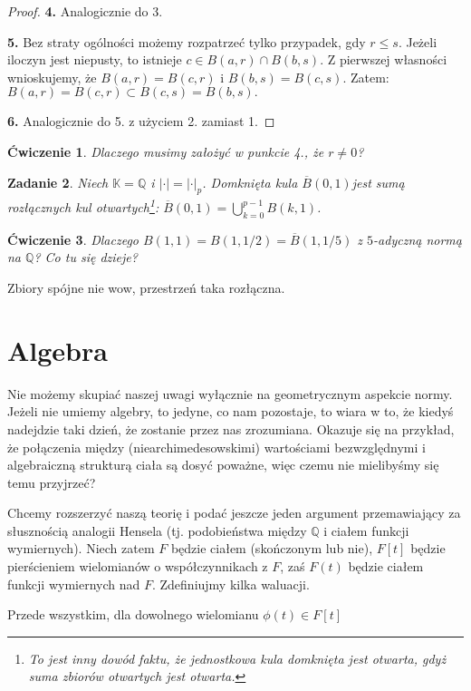 \documentclass[a4paper,fleqn]{article}
\newtheorem{prbh}{Zadanie}
\newtheorem{prb}[prbh]{\'Cwiczenie}
\begin{document}
\begin{multicols}{2}
\begin{proof}
\textbf{4.} Analogicznie do 3.

\textbf{5.} Bez straty ogólności możemy rozpatrzeć tylko przypadek, gdy $r\le s$. Jeżeli iloczyn jest niepusty, to istnieje $c \in B(a,r) \cap B(b,s)$. Z pierwszej własności wnioskujemy, że $B(a,r) = B(c,r)$ i $B(b,s) = B(c,s)$. Zatem: $B(a,r) = B(c,r) \subset B(c,s) = B(b,s).$

\textbf{6.} Analogicznie do 5. z użyciem 2. zamiast 1.\end{proof}
\begin{prb}Dlaczego musimy założyć w punkcie 4., że $r\neq 0$?\end{prb}

\begin{prbh}Niech $\mathbb K = \mathbb Q$ i $|\cdot| = |\cdot|_p$. Domknięta kula $\overline{B}(0,1)$jest sumą rozłącznych kul otwartych\footnote{To jest inny dowód faktu, że jednostkowa kula domknięta jest otwarta, gdyż suma zbiorów otwartych jest otwarta.}: $\overline{B}(0,1) = \bigcup_{k=0}^{p-1} B(k,1)$. \end{prbh}

\begin{prb}Dlaczego $B(1,1) = B(1,1/2) = \overline{B}(1,1/5)$ z $5$-adyczną normą na $\mathbb Q$? Co tu się dzieje?\end{prb}

Zbiory spójne nie wow, przestrzeń taka rozłączna.

\section{Algebra}
Nie możemy skupiać naszej uwagi wyłącznie na geometrycznym aspekcie normy. Jeżeli nie umiemy algebry, to jedyne, co nam pozostaje, to wiara w to, że kiedyś nadejdzie taki dzień, że zostanie przez nas zrozumiana. Okazuje się na przykład, że połączenia między (niearchimedesowskimi) wartościami bezwzględnymi i algebraiczną strukturą ciała są dosyć poważne, więc czemu nie mielibyśmy się temu przyjrzeć?

Chcemy rozszerzyć naszą teorię i podać jeszcze jeden argument przemawiający za słusznością analogii Hensela (tj. podobieństwa między $\mathbb Q$ i ciałem funkcji wymiernych). Niech zatem $F$ będzie ciałem (skończonym lub nie), $F[t]$ będzie pierścieniem wielomianów o współczynnikach z $F$, zaś $F(t)$ będzie ciałem funkcji wymiernych nad $F$. Zdefiniujmy kilka waluacji.

Przede wszystkim, dla dowolnego wielomianu $\phi(t) \in F[t]$


\end{multicols}
\end{document}
